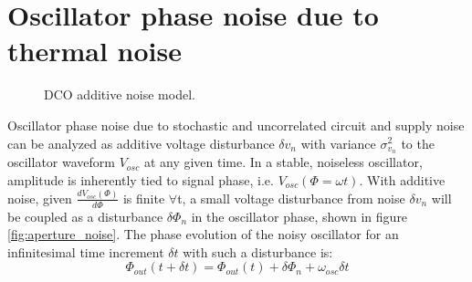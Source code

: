 	\appendix

	\section{Oscillator phase noise due to thermal noise}\label{osc_pn_additive_append}


	\begin{figure}[htb!]
		\center
		\caption{DCO additive noise model.}
		\label{fig:dco_noise2}
	\end{figure}
	\FloatBarrier

	 Oscillator phase noise due to stochastic and uncorrelated circuit and supply noise can be analyzed as additive voltage disturbance $\delta v_n$ with variance $\sigma_{v_n}^2$ to the oscillator waveform $V_{osc}$ at any given time.  In a stable, noiseless oscillator, amplitude is inherently tied to signal phase, i.e. $V_{osc}(\Phi=\omega t)$. With additive noise, given $\frac{dV_{osc}(\Phi)}{d\Phi}$ is finite $\forall$t, a small voltage disturbance from noise $\delta v_{n}$ will be coupled as a disturbance $\delta\Phi_{n}$ in the oscillator phase, shown in figure \ref{fig:aperture_noise}. The phase evolution of the noisy oscillator for an infinitesimal time increment $\delta t$  with such a disturbance is:
	 \begin{equation}
		\Phi_{out}(t+\delta t) = \Phi_{out}(t) + \delta\Phi_n + \omega_{osc}\delta t \label{eq:rwalk_ph}
	 \end{equation}

